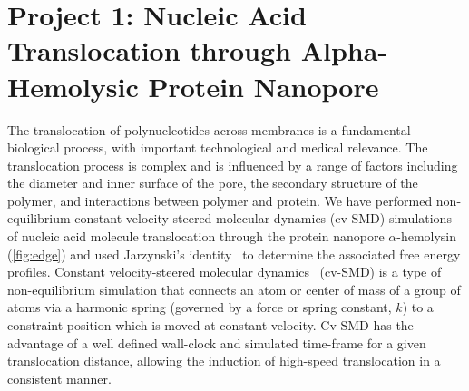 \documentclass[a4paper,10pt]{article}
\begin{document}


\section{Project 1: Nucleic Acid Translocation through Alpha-Hemolysic Protein Nanopore}

The translocation of polynucleotides across membranes is a fundamental
biological process, with important technological and medical
relevance.  The translocation process is complex and is influenced by
a range of factors including the diameter and inner surface of the
pore, the secondary structure of the polymer, and interactions between
polymer and protein. We have performed non-equilibrium constant
velocity-steered molecular dynamics (cv-SMD) simulations of nucleic
acid molecule translocation through the protein nanopore
$\alpha$-hemolysin (\ref{fig:edge}) and used Jarzynski's
identity~\cite{jarz} to determine the associated free
energy profiles. Constant velocity-steered molecular
dynamics~\cite{namd} (cv-SMD) is a type of non-equilibrium
simulation that connects an atom or center of mass of a group of atoms
via a harmonic spring (governed by a force or spring constant, $k$) to
a constraint position which is moved at constant velocity. Cv-SMD has
the advantage of a well defined wall-clock and simulated time-frame
for a given translocation distance, allowing the induction of
high-speed translocation in a consistent manner.
\end{document}
